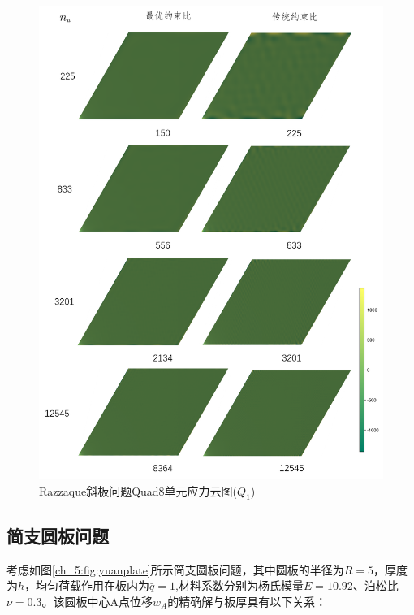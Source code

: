 \begin{figure}[!h]
    \centering 
        \includegraphics[scale=0.6]{figures/shearlocking/skewplateQ1_quad8.png}
        \caption{Razzaque斜板问题Quad8单元应力云图($Q_1$)}\label{ch_5:fig:skewplateQ1_quad8}
\end{figure}

\subsection{简支圆板问题}
考虑如图\ref{ch_5:fig:yuanplate}所示简支圆板问题，其中圆板的半径为$R=5$，厚度为$h$，均匀荷载作用在板内为$\bar{q}=1$,材料系数分别为杨氏模量$E=10.92$、泊松比$\nu=0.3$。该圆板中心A点位移$w_A$的精确解与板厚具有以下关系：

